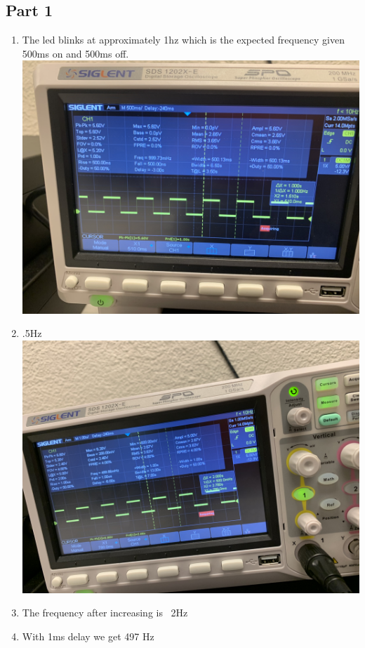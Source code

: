 \documentclass[]{article}
\begin{document}
\subsection*{Part 1}
\begin{enumerate}
	\item The led blinks at approximately 1hz which is the expected frequency given 500ms on and 500ms off.\\
	\includegraphics[scale=.1]{images/1-1.jpg}\pagebreak
	\item .5Hz\\
	\includegraphics[scale=.1]{images/1-2.jpg}\pagebreak
	\item The frequency after increasing is ~2Hz
	\item With 1ms delay we get 497 Hz\\

\end{enumerate}
\end{document}
